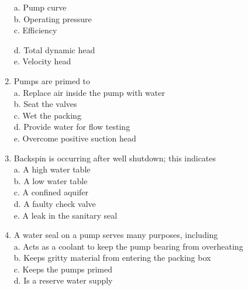 \documentclass{article}
\begin{document}
\begin{enumerate}[1.]
a. Pump curve\\

b. Operating pressure\\

c. Efficiency

d. Total dynamic head\\

e. Velocity head\\

\item Pumps are primed to\\

a. Replace air inside the pump with water\\

b. Seat the valves\\

c. Wet the packing\\

d. Provide water for flow testing\\

e. Overcome positive suction head\\

\item Backspin is occurring after well shutdown; this indicates\\

a. A high water table\\

b. A low water table\\

c. A confined aquifer\\

d. A faulty check valve\\

e. A leak in the sanitary seal\\

  
  
\item A water seal on a pump serves many purposes, including\\

a. Acts as a coolant to keep the pump bearing from overheating\\

b. Keeps gritty material from entering the packing box\\

c. Keeps the pumps primed\\

d. Is a reserve water supply\\


\end{enumerate}
\end{document}
